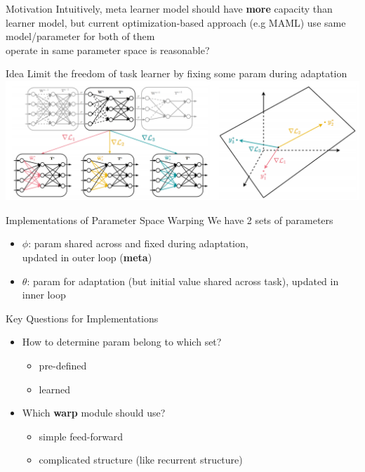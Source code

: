 \documentclass{beamer}
\begin{document}
\begin{frame}{Motivation}
  Intuitively, meta learner model should have \textbf{more} capacity than learner model, but current optimization-based approach (e.g MAML) use same model/parameter for both of them\\
  \center operate in same parameter space is reasonable?
\end{frame}

\begin{frame}{Idea}
  Limit the freedom of task learner by fixing some param during adaptation
  \center \includegraphics[width=1.0\textwidth]{fig/space-warp.png}
\end{frame}

\begin{frame}{Implementations of Parameter Space Warping}
  We have 2 sets of parameters
  \begin{itemize}
    \item $\phi$: param shared across and fixed during adaptation,\\ updated in outer loop (\textbf{meta})
    \item $\theta$: param for adaptation (but initial value shared across task), updated in inner loop
  \end{itemize}
\end{frame}

\begin{frame}{Key Questions for Implementations}
  \begin{itemize}
    \item How to determine param belong to which set?
      \begin{itemize}
        \item pre-defined
        \item learned
      \end{itemize}
    \item Which \textbf{warp} module should use?
      \begin{itemize}
        \item simple feed-forward
        \item complicated structure (like recurrent structure)
      \end{itemize}
  \end{itemize}
\end{frame}
\end{document}
